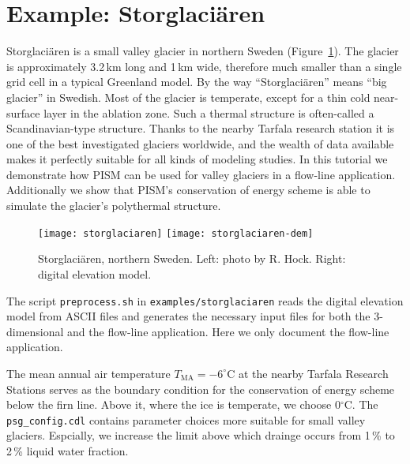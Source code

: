 
\section{Example: Storglaci{\"a}ren}\label{sec:storglaciaren} 

Storglaci{\"a}ren is a small valley glacier in northern Sweden (Figure~\ref{fig:storglaciaren}). The glacier is approximately 3.2\,km long and 1\,km wide, therefore much smaller than a single grid cell in a typical Greenland model. By the way ``Storglaci{\"a}ren'' means ``big glacier'' in Swedish. Most of the glacier is temperate, except for a thin cold near-surface layer in the ablation zone. Such a thermal structure is often-called a Scandinavian-type structure. Thanks to the nearby Tarfala research station it is one of the best investigated glaciers worldwide, and the wealth of data available makes it perfectly suitable for all kinds of modeling studies. In this tutorial we demonstrate how PISM can be used for valley glaciers in a flow-line application. Additionally we show that PISM's conservation of energy scheme is able to simulate the glacier's polythermal structure.

\begin{figure}[ht]
  \centering
  \texttt{[image: storglaciaren]}\qquad
  \texttt{[image: storglaciaren-dem]}
  \caption{Storglaci{\"a}ren, northern Sweden. Left: photo by R. Hock. Right: digital elevation model.}
  \label{fig:storglaciaren}
\end{figure}

The script \texttt{preprocess.sh} in \texttt{examples/storglaciaren} reads the digital elevation model from ASCII files and generates the necessary input files for both the 3-dimensional and the flow-line application. Here we only document the flow-line application.

The mean annual air temperature $T_{\mathrm{MA}}=-6^{\circ}$C at the nearby Tarfala Research Stations serves as the boundary condition for the conservation of energy scheme below the firn line. Above it, where the ice is temperate, we choose 0$^{\circ}$C. The \texttt{psg_config.cdl} contains parameter choices more suitable for small valley glaciers. Espcially, we increase the limit above which drainge occurs from 1\,\% to 2\,\% liquid water fraction.


